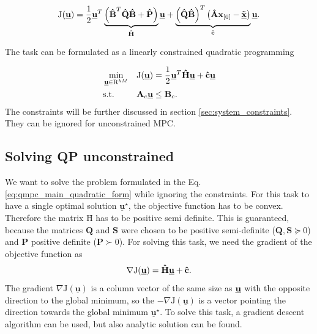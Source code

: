 \documentclass[a4paper,11pt,titlepage]{article}
\newcommand{\uvec}{\textbf{\underline{u}}}
\newcommand{\macJ}{\mathrm{J}(\uvec)}
\begin{document}
\begin{equation}
\mathrm{J}(\underline{\textbf{u}}) = \frac{1}{2}\uvec^T\underbrace{\left(\textbf{\^B}^T\textbf{\^Q}\textbf{\^B} + \textbf{\^P}\right)}_{\textbf{\^H}}\uvec + \underbrace{\left(\textbf{\^Q}\textbf{\^B}\right)^T\left(\textbf{\^A}\textbf{x}_{[0]} - \textbf{\underline{\~x}}\right)}_{\textbf{\^c}}\uvec.
\label{eq:mpc_objective_large}
\end{equation}

The task can be formulated as a linearly constrained quadratic programming

\begin{equation}
\label{eq:qmpc_main_quadratic_form}
\begin{aligned}
& \min_{\uvec \in \mathrm{R}^{kM}}
& & \mathrm{J}(\uvec) = \frac{1}{2}\uvec^T\textbf{\^H}\uvec + \textbf{\^c} \uvec\\
& \text{s.t.}
& & \textbf{A}_c \uvec \leq \textbf{B}_c.
\end{aligned}
\end{equation}
The constraints will be further discussed in section \ref{sec:system_constraints}. They can be ignored for unconstrained MPC.

\subsection{Solving QP unconstrained}
We want to solve the problem formulated in the Eq. \ref{eq:qmpc_main_quadratic_form} while ignoring the constraints. For this task to have a single optimal solution $\underline{\textbf{u}}^{\star}$, the objective function has to be convex. Therefore the matrix $\textbf{\^H}$ has to be positive semi definite. This is guaranteed, because the matrices  $\textbf{Q}$ and $\textbf{S}$ were chosen to be positive semi-definite ($\textbf{Q}, \textbf{S} \succeq 0$) and $\textbf{P}$ positive definite ($\textbf{P} \succ 0$). For solving this task, we need the gradient of the objective function \cite{zometa2012implementation} as
\begin{equation}
\label{eq:J_grad}
\nabla\macJ = \textbf{\^H}\uvec + \textbf{\^c}.
\end{equation}
The gradient $\nabla\mathrm{J}(\underline{\textbf{u}})$ is a column vector of the same size as $\uvec$ with the opposite direction to the global minimum, so the $-\nabla\mathrm{J}(\underline{\textbf{u}})$ is a vector pointing the direction towards the global minimum $\underline{\textbf{u}}^{\star}$. To solve this task, a gradient descent algorithm can be used, but also analytic solution can be found.
\end{document}

